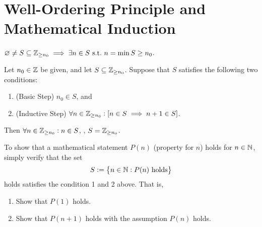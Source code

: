 \documentclass[11pt,openany]{article}
\begin{document}
\newpage
\section{Well-Ordering Principle and Mathematical Induction}
\begin{remark*}
	\textcolor{gray!50}{$\varnothing\neq S\subseteq\mathbb{Z}_{\geq n_0}\implies\exists n\in S\ \text{s.t.}\ n=\min S\geq n_0$.}
\end{remark*}
\vfill
{}
\begin{remark*}
	\textcolor{gray!50}{Let $n_0\in\mathbb{Z}$ be given, and let $S\subseteq\mathbb{Z}_{\geq n_0}$. Suppose that $S$ satisfies the following two conditions: \begin{enumerate}
		\item (Basic Step) $n_0\in S$, and
		\item (Inductive Step) $\forall n\in\mathbb{Z}_{\geq n_0}: [n\in S\implies n+1\in S]$.
	\end{enumerate} Then $\forall n\in\mathbb{Z}_{\geq n_0}:n\in S$, \ie, $S=\mathbb{Z}_{\geq n_0}$.}
\end{remark*}
\vfill
\begin{remark*}
	To show that a mathematical statement $P(n)$ (property for $n$) holds for $n\in\mathbb{N}$, simply verify that the set \[
	S:=\set{n\in\N:P(n)\ \text{holds}}
	\] holds satisfies the condition 1 and 2 above. That is, \begin{enumerate}
		\item Show that $P(1)$ holds.
		\item Show that $P(n+1)$ holds with the assumption $P(n)$ holds.
	\end{enumerate}
\end{remark*}
\end{document}
